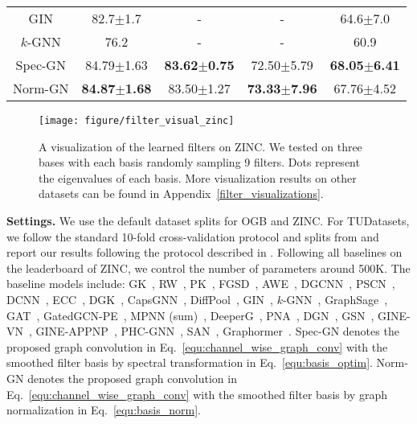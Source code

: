\documentclass[nohyperref]{article}
\theoremstyle{plain}
\theoremstyle{definition}
\theoremstyle{remark}
\begin{document}
\begin{table}[h]
{\begin{tabular}{ccccc}
			GIN                      			    & 82.7$\pm$1.7             &-                    		&-                           & 64.6$\pm$7.0  \\
			$k$-GNN          & 76.2                            &-                         &-                           & 60.9                              			\\
			\midrule
			Spec-GN         &84.79$\pm$1.63 &\textbf{83.62}$\pm$\textbf{0.75} &72.50$\pm$5.79  &\textbf{68.05}$\pm$\textbf{6.41}\\
			Norm-GN          &\textbf{84.87}$\pm$\textbf{1.68} &83.50$\pm$1.27 &\textbf{73.33}$\pm$\textbf{7.96} &67.76$\pm$4.52\\
			\bottomrule
		\end{tabular}
	}
	\vspace{-10pt}
\end{table}

\begin{figure*}[th]
	\centering
	\texttt{[image: figure/filter\_visual\_zinc]}
	\vspace{-10pt}
	\caption{A visualization of the learned filters on ZINC. We tested on three bases with each basis randomly sampling 9 filters. Dots represent the eigenvalues of each basis. More visualization results on other datasets can be found in Appendix~\ref{filter_visualizations}.}
	\label{fig:filter_visual}
	\vspace{-10pt}
\end{figure*}

\textbf{Settings.}
We use the default dataset splits for OGB and ZINC.
For TUDatasets, we follow the standard 10-fold cross-validation protocol and splits from \cite{zhang2018end} and report our results following the protocol described in \cite{xu2018how,ying2018hierarchical}.
Following all baselines on the leaderboard of ZINC, we control the number of parameters around 500K.
The baseline models include: 
GK~\cite{shervashidze2009efficient},
RW~\cite{vishwanathan2010graph},
PK~\cite{neumann2016propagation},
FGSD~\cite{verma2017hunt},
AWE~\cite{pmlr-v80-ivanov18a},
DGCNN~\cite{zhang2018end},
PSCN~\cite{niepert2016learning},
DCNN~\cite{atwood2016diffusion},
ECC~\cite{simonovsky2017dynamic},
DGK~\cite{yanardag2015deep},
CapsGNN~\cite{xinyi2018capsule},
DiffPool~\cite{ying2018hierarchical},
GIN~\cite{xu2018how},
$k$-GNN~\cite{morris2019weisfeiler},
GraphSage~\cite{hamilton2017inductive},
GAT~\cite{velickovic2018graph},
GatedGCN-PE~\cite{bresson2017residual},
MPNN (sum)~\cite{gilmer2017neural},
DeeperG~\cite{li2020deepergcn},
PNA~\cite{corso2020pna},
DGN~\cite{beani2021directional},
GSN~\cite{bouritsas2020improving},
GINE-{\scriptsize VN}~\cite{brossard2020graph},
GINE-{\scriptsize APPNP}~\cite{brossard2020graph},
PHC-GNN~\cite{le2021parameterized},
SAN~\cite{Kreuzer2021rethinking},
Graphormer~\cite{ying2021transformers}.
Spec-GN denotes the proposed graph convolution in Eq.~\ref{equ:channel_wise_graph_conv} with the smoothed filter basis by spectral transformation in Eq.~\ref{equ:basis_optim}.
Norm-GN denotes the proposed graph convolution in Eq.~\ref{equ:channel_wise_graph_conv} with the smoothed filter basis by graph normalization in Eq.~\ref{equ:basis_norm}.
\end{document}
